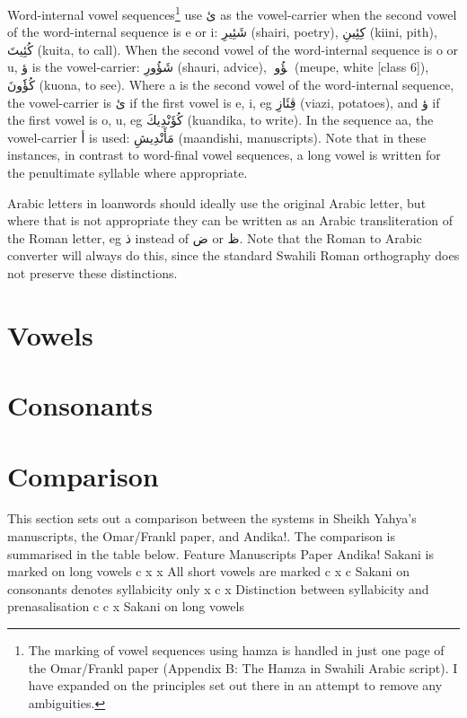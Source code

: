 \documentclass[a4paper,10pt]{article}
\begin{document}
Word-internal vowel sequences\footnote{The marking of vowel sequences using hamza is handled in just one page of the Omar/Frankl paper (Appendix B: The Hamza in Swahili Arabic script). I have expanded on the principles set out there in an attempt to remove any ambiguities.} use ئ as the vowel-carrier when the second vowel of the word-internal sequence is e or i: شَئِيرِ (shairi, poetry), كِئِينِ (kiini, pith), كُئِيتَ (kuita, to call). When the second vowel of the word-internal sequence is o or u, ؤ is the vowel-carrier: شَؤُورِ (shauri, advice), مٖؤُوپٖ (meupe, white [class 6]), كُؤٗونَ (kuona, to see). Where a is the second vowel of the word-internal sequence, the vowel-carrier is ئ if the first vowel is e, i, eg ڤِئَازِ (viazi, potatoes), and ؤ if the first vowel is o, u, eg كُؤَنْدِيكَ (kuandika, to write). In the sequence aa, the vowel-carrier أ is used: مَأَنْدِيشِ (maandishi, manuscripts). Note that in these instances, in contrast to word-final vowel sequences, a long vowel is written for the penultimate syllable where appropriate.

Arabic letters in loanwords should ideally use the original Arabic letter, but where that is not appropriate they can be written as an Arabic transliteration of the Roman letter, eg ذ instead of ض or ظ. Note that the Roman to Arabic converter will always do this, since the standard Swahili Roman orthography does not preserve these distinctions.


\section{Vowels}


\section{Consonants}


\section{Comparison}



This section sets out a comparison between the systems in Sheikh Yahya's manuscripts, the Omar/Frankl paper, and Andika!. The comparison is summarised in the table below.
Feature 	Manuscripts 	Paper 	Andika!
Sakani is marked on long vowels 	c 	x 	x
All short vowels are marked 	c 	x 	c
Sakani on consonants denotes syllabicity only 	x 	c 	x
Distinction between syllabicity and prenasalisation 	c 	c 	x
Sakani on long vowels
\end{document}
